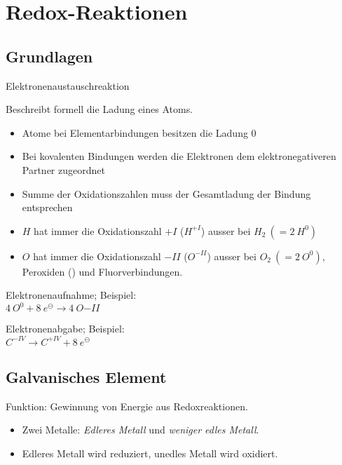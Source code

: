 \section{Redox-Reaktionen}

\subsection{Grundlagen}

\begin{definition}[Redoxreaktion]
	Elektronenaustauschreaktion
\end{definition}

\begin{definition}[Oxidationszahl]
	Beschreibt formell die Ladung eines Atoms.
	
	\begin{itemize}
		\item Atome bei Elementarbindungen besitzen die Ladung 0
		\item Bei kovalenten Bindungen werden die Elektronen dem elektronegativeren Partner zugeordnet
		\item Summe der Oxidationszahlen muss der Gesamtladung der Bindung entsprechen
		\item $H$ hat immer die Oxidationszahl $+I$ ($H^{+I}$) ausser bei $H_2\ (=2\ H^0)$
		\item $O$ hat immer die Oxidationszahl $-II$ ($O^{-II}$) ausser bei $O_2\ (=2\ O^0)$, Peroxiden () und Fluorverbindungen.
	\end{itemize}
\end{definition}

\begin{definition}[Reduktion]
	Elektronenaufnahme; Beispiel:\\
	$4\ O^0 + 8\ e^\ominus\rightarrow 4\ O{-II}$
\end{definition}

\begin{definition}[Oxidation]
	Elektronenabgabe; Beispiel:\\
	$C^{-IV} \rightarrow C^{+IV} + 8\ e^\ominus$
\end{definition}

\subsection{Galvanisches Element}

Funktion: Gewinnung von Energie aus Redoxreaktionen.

\begin{itemize}
	\item Zwei Metalle: \textit{Edleres Metall} und \textit{weniger edles Metall}.
	\item Edleres Metall wird reduziert, unedles Metall wird oxidiert.
\end{itemize}

